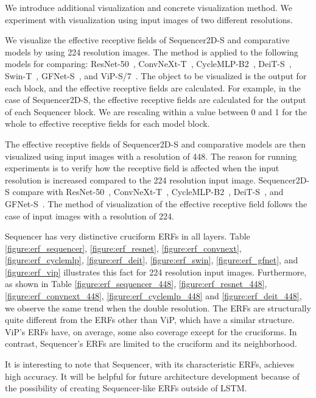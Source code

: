 \documentclass{article}
\begin{document}
We introduce additional visualization and concrete visualization method. We experiment with visualization using input images of two different resolutions.

We visualize the effective receptive fields of Sequencer2D-S and comparative models by using 224 resolution images. The method is applied to the following models for comparing: ResNet-50~\cite{he2016deep}, ConvNeXt-T~\cite{liu2022convnet}, CycleMLP-B2~\cite{chen2022cyclemlp}, DeiT-S~\cite{touvron2020training}, Swin-T~\cite{liu2021swin}, GFNet-S~\cite{rao2021global}, and ViP-S/7~\cite{hou2022vision}. The object to be visualized is the output for each block, and the effective receptive fields are calculated. For example, in the case of Sequencer2D-S, the effective receptive fields are calculated for the output of each Sequencer block. We are rescaling within a value between 0 and 1 for the whole to effective receptive fields for each model block.

The effective receptive fields of Sequencer2D-S and comparative models are then visualized using input images with a resolution of 448. The reason for running experiments is to verify how the receptive field is affected when the input resolution is increased compared to the 224 resolution input image. Sequencer2D-S compare with ResNet-50~\cite{he2016deep}, ConvNeXt-T~\cite{liu2022convnet}, CycleMLP-B2~\cite{chen2022cyclemlp}, DeiT-S~\cite{touvron2020training}, and GFNet-S~\cite{hou2022vision}. The method of visualization of the effective receptive field follows the case of input images with a resolution of 224.

Sequencer has very distinctive cruciform ERFs in all layers. Table \ref{figure:erf_sequencer}, \ref{figure:erf_resnet}, \ref{figure:erf_convnext}, \ref{figure:erf_cyclemlp}, \ref{figure:erf_deit}, \ref{figure:erf_swin}, \ref{figure:erf_gfnet}, and \ref{figure:erf_vip} illustrates this fact for 224 resolution input images. Furthermore, as shown in Table \ref{figure:erf_sequencer_448}, \ref{figure:erf_resnet_448}, \ref{figure:erf_convnext_448}, \ref{figure:erf_cyclemlp_448} and \ref{figure:erf_deit_448}, we observe the same trend when the double resolution. The ERFs are structurally quite different from the ERFs other than ViP, which have a similar structure. ViP's ERFs have, on average, some also coverage except for the cruciforms. In contrast, Sequencer's ERFs are limited to the cruciform and its neighborhood.

It is interesting to note that Sequencer, with its characteristic ERFs, achieves high accuracy. It will be helpful for future architecture development because of the possibility of creating Sequencer-like ERFs outside of LSTM.
\end{document}
